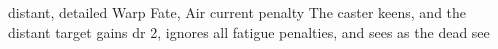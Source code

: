   {distant, detailed}%
  {Warp}%
  {Fate, Air}%
  {current  penalty}%
  {The caster keens, and the distant target gains \gls{dr} 2, ignores all \gls{fatigue} penalties, and sees as the dead see}%
  {}

